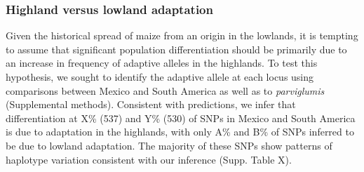 {\subsubsection{Highland versus lowland adaptation}  

Given the historical spread of maize from an origin in the lowlands, it is tempting to assume that significant population differentiation should be primarily due to an increase in frequency of adaptive alleles in the highlands.
To test this hypothesis, we sought to identify the adaptive allele at each locus using comparisons between Mexico and South America as well as to \emph{parviglumis} (Supplemental methods).
%
%
%
%
Consistent with predictions, we infer that differentiation at X\% (537) and Y\% (530) of SNPs in Mexico and South America is due to adaptation in the highlands, with only A\% and B\% of SNPs inferred to be due to lowland adaptation. The majority of these SNPs show patterns of haplotype variation consistent with our inference (Supp. Table X).
}
